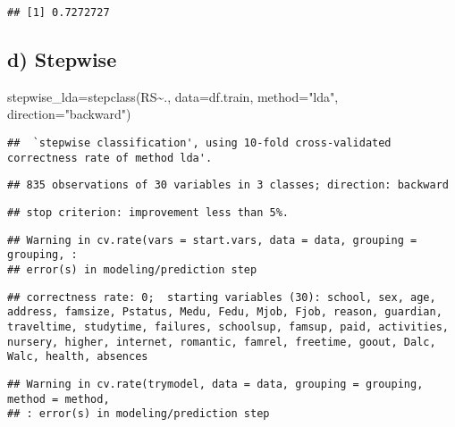 \documentclass[
]{article}
\newenvironment{Shaded}{\begin{snugshade}}{\end{snugshade}}
\newcommand{\AttributeTok}[1]{\textcolor[rgb]{0.77,0.63,0.00}{#1}}
\newcommand{\FunctionTok}[1]{\textcolor[rgb]{0.00,0.00,0.00}{#1}}
\newcommand{\NormalTok}[1]{#1}
\newcommand{\OtherTok}[1]{\textcolor[rgb]{0.56,0.35,0.01}{#1}}
\newcommand{\SpecialCharTok}[1]{\textcolor[rgb]{0.00,0.00,0.00}{#1}}
\newcommand{\StringTok}[1]{\textcolor[rgb]{0.31,0.60,0.02}{#1}}
\begin{document}
\begin{verbatim}
## [1] 0.7272727
\end{verbatim}

\hypertarget{d-stepwise}{%
\subsection{d) Stepwise}\label{d-stepwise}}

\begin{Shaded}
\begin{Highlighting}[]
\NormalTok{stepwise\_lda}\OtherTok{=}\FunctionTok{stepclass}\NormalTok{(RS}\SpecialCharTok{\textasciitilde{}}\NormalTok{., }\AttributeTok{data=}\NormalTok{df.train, }\AttributeTok{method=}\StringTok{"lda"}\NormalTok{, }\AttributeTok{direction=}\StringTok{"backward"}\NormalTok{)}
\end{Highlighting}
\end{Shaded}

\begin{verbatim}
##  `stepwise classification', using 10-fold cross-validated correctness rate of method lda'.
\end{verbatim}

\begin{verbatim}
## 835 observations of 30 variables in 3 classes; direction: backward
\end{verbatim}

\begin{verbatim}
## stop criterion: improvement less than 5%.
\end{verbatim}

\begin{verbatim}
## Warning in cv.rate(vars = start.vars, data = data, grouping = grouping, :
## error(s) in modeling/prediction step
\end{verbatim}

\begin{verbatim}
## correctness rate: 0;  starting variables (30): school, sex, age, address, famsize, Pstatus, Medu, Fedu, Mjob, Fjob, reason, guardian, traveltime, studytime, failures, schoolsup, famsup, paid, activities, nursery, higher, internet, romantic, famrel, freetime, goout, Dalc, Walc, health, absences
\end{verbatim}

\begin{verbatim}
## Warning in cv.rate(trymodel, data = data, grouping = grouping, method = method,
## : error(s) in modeling/prediction step
\end{verbatim}
\end{document}
